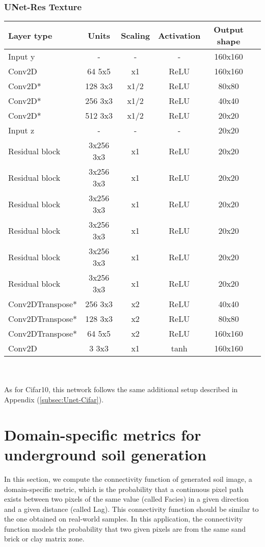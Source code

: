 \begin{table*}[!h]
\subsubsection{UNet-Res Texture} 
{
	\centering
	\begin{tabular}{|l|c|c|c|c|c|}
		\hline
		Layer type & Units & Scaling & Activation & Output shape\\
		\hline
		Input y & - & - & - & 160x160\\
		Conv2D & 64 5x5 & x1 & ReLU & 160x160 \\
		Conv2D* & 128 3x3 & x1/2 & ReLU & 80x80 \\
		Conv2D* & 256 3x3 & x1/2 & ReLU & 40x40 \\
		Conv2D* & 512 3x3 & x1/2 & ReLU & 20x20 \\
		Input z & - & - & - & 20x20 \\
		Residual block & 3x256 3x3 & x1 & ReLU & 20x20 \\
		Residual block & 3x256 3x3 & x1 & ReLU & 20x20 \\
		Residual block & 3x256 3x3 & x1 & ReLU & 20x20 \\
		Residual block & 3x256 3x3 & x1 & ReLU & 20x20 \\
		Residual block & 3x256 3x3 & x1 & ReLU & 20x20 \\
		Residual block & 3x256 3x3 & x1 & ReLU & 20x20 \\
		Conv2DTranspose* & 256 3x3 & x2 & ReLU & 40x40 \\
		Conv2DTranspose* & 128 3x3 & x2 & ReLU & 80x80 \\
		Conv2DTranspose* & 64 5x5 & x2 & ReLU & 160x160 \\
		Conv2D & 3 3x3 & x1 & tanh & 160x160 \\
		\hline
	\end{tabular}
}\\~\\
\noindent
As for Cifar10, this network follows the same additional setup described in Appendix (\ref{subsec:Unet-Cifar}).

\section{Domain-specific metrics for underground soil generation}
\label{app:geostatistics}

In this section, we compute the connectivity function \cite{Lemmens2017} of generated soil image, a domain-specific metric, which is the probability that a continuous pixel path exists between two pixels of the same value (called Facies) in a given direction and a given distance (called Lag). This connectivity function should be similar to the one obtained on real-world samples. In this application, the connectivity function models the probability that two given pixels are from the same sand brick or clay matrix zone.


\end{table*}
